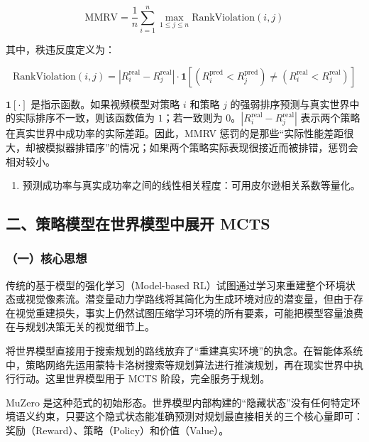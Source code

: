 \[
\mathrm{MMRV}
= \frac{1}{n} \sum_{i=1}^{n} \max_{1 \le j \le n}
\mathrm{RankViolation}(i, j)
\]

其中，秩违反度定义为：

\[
\mathrm{RankViolation}(i, j)
= \left|R_i^{\mathrm{real}} - R_j^{\mathrm{real}}\right|
\cdot
\mathbf{1}\left[
(R_i^{\mathrm{pred}} \lt R_j^{\mathrm{pred}})
\ne
(R_i^{\mathrm{real}} \lt R_j^{\mathrm{real}})
\right]
\]

\(\mathbf{1}[\cdot]\) 是指示函数。如果视频模型对策略 \(i\) 和策略 \(j\) 的强弱排序预测与真实世界中的实际排序不一致，则该函数值为 \(1\)；若一致则为 \(0\)。\(\left|R_i^{\mathrm{real}} - R_j^{\mathrm{real}}\right|\) 表示两个策略在真实世界中成功率的实际差距。因此，MMRV 惩罚的是那些``实际性能差距很大，却被模拟器排错序''的情况；如果两个策略实际表现很接近而被排错，惩罚会相对较小。

\begin{enumerate}
\def\labelenumi{\arabic{enumi}.}
\setcounter{enumi}{1}
\tightlist
\item
  预测成功率与真实成功率之间的线性相关程度：可用皮尔逊相关系数等量化。
\end{enumerate}

\hypertarget{ux4e8cux7b56ux7565ux6a21ux578bux5728ux4e16ux754cux6a21ux578bux4e2dux5c55ux5f00-mcts}{%
\subsection{二、策略模型在世界模型中展开 MCTS}\label{ux4e8cux7b56ux7565ux6a21ux578bux5728ux4e16ux754cux6a21ux578bux4e2dux5c55ux5f00-mcts}}

\hypertarget{ux4e00ux6838ux5fc3ux601dux60f3-27}{%
\subsubsection{（一）核心思想}\label{ux4e00ux6838ux5fc3ux601dux60f3-27}}

传统的基于模型的强化学习（Model-based RL）试图通过学习来重建整个环境状态或视觉像素流。潜变量动力学路线将其简化为生成环境对应的潜变量，但由于存在视觉重建损失，事实上仍然试图压缩学习环境的所有要素，可能把模型容量浪费在与规划决策无关的视觉细节上。

将世界模型直接用于搜索规划的路线放弃了``重建真实环境''的执念。在智能体系统中，策略网络先运用蒙特卡洛树搜索等规划算法进行推演规划，再在现实世界中执行行动。这里世界模型用于 MCTS 阶段，完全服务于规划。

MuZero 是这种范式的初始形态。世界模型内部构建的``隐藏状态''没有任何特定环境语义约束，只要这个隐式状态能准确预测对规划最直接相关的三个核心量即可：奖励（Reward）、策略（Policy）和价值（Value）。

